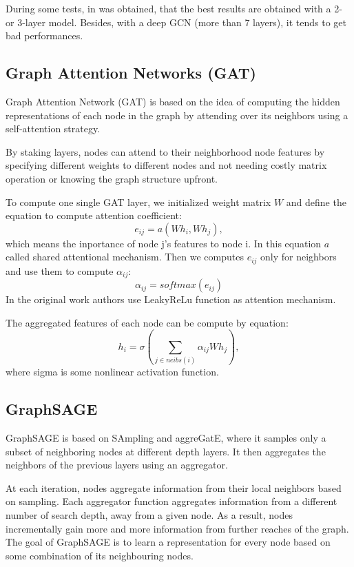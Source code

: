 \documentclass[a4paper,14pt]{article}
\begin{document}
During some tests, in \cite{GCN} was obtained, that the best results are obtained with a 2- or 3-layer model. Besides, with a deep GCN (more than 7 layers), it tends to get bad performances.

\subsection{Graph Attention Networks (GAT)}
Graph Attention Network (GAT) \cite{GAT} is based on the idea of computing the hidden representations of each node in the graph by attending over its neighbors using a self-attention strategy.

By staking layers, nodes can attend to their neighborhood node features by specifying different weights to different nodes and not needing costly matrix operation or knowing the graph structure upfront.

To compute one single GAT layer, we initialized weight matrix $W$ and define the equation to compute attention coefficient:
\begin{equation}
    e_{ij} = a(Wh_i,Wh_j), 
\end{equation}
which means the inportance of node j's features to node i. In this equation $a$ called shared attentional mechanism. Then we computes $e_{ij}$ only for neighbors and use them to compute $\alpha_{ij}$:
\begin{equation}
    \alpha_{ij} = softmax(e_{ij})
\end{equation}
In the original work \cite{GAT} authors use LeakyReLu function as attention mechanism.

The aggregated features of each node can be compute by equation:
\begin{equation}
    h_i = \sigma(\sum_{j \in neibs(i)}\alpha_{ij}Wh_j),
\end{equation}
where sigma is some nonlinear activation function. 

\subsection{GraphSAGE}
GraphSAGE \cite{SAGE} is based on SAmpling and aggreGatE, where it samples only a subset of neighboring nodes at different depth layers. It then aggregates the neighbors of the previous layers using an aggregator.

At each iteration, nodes aggregate information from their local neighbors based on sampling. Each aggregator function aggregates information from a different number of search depth, away from a given node. As a result, nodes incrementally gain more and more information from further reaches of the graph. The goal of GraphSAGE is to learn a representation for every node based on some combination of its neighbouring nodes.
\end{document}
